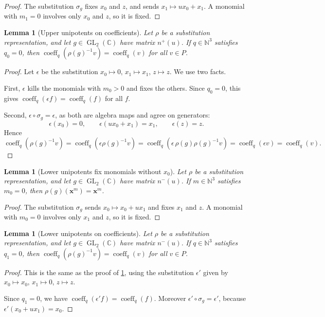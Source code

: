\documentclass[11pt]{article}
\newtheorem{lemma}[theorem]{Lemma}
\theoremstyle{definition}
\theoremstyle{remark}
\newcommand{\CC}{\mathbb{C}}
\newcommand{\NN}{\mathbb{N}}
\DeclareMathOperator{\GL}{GL}
\DeclareMathOperator{\coeff}{coeff}
\begin{document}
\begin{proof}
The substitution $\sigma_g$ fixes $x_0$ and $z$, and sends $x_1\mapsto ux_0+x_1$. A monomial with $m_1=0$ involves only $x_0$ and $z$, so it is fixed.
\end{proof}

\begin{lemma}[Upper unipotents on coefficients]\label{lem:gm_coeff_rho_ux_inv}
Let $\rho$ be a substitution representation, and let $g\in\GL_2(\CC)$ have matrix $n^+(u)$. If $q\in\NN^3$ satisfies $q_0=0$, then $\coeff_q(\rho(g)^{-1}v)=\coeff_q(v)$ for all $v\in P$.
\end{lemma}

\begin{proof}
Let $\epsilon$ be the substitution $x_0\mapsto0$, $x_1\mapsto x_1$, $z\mapsto z$. We use two facts.

First, $\epsilon$ kills the monomials with $m_0>0$ and fixes the others. Since $q_0=0$, this gives $\coeff_q(\epsilon f)=\coeff_q(f)$ for all $f$.

Second, $\epsilon\circ\sigma_g=\epsilon$, as both are algebra maps and agree on generators:
\[
\epsilon(x_0)=0,\qquad \epsilon(ux_0+x_1)=x_1,\qquad \epsilon(z)=z .
\]
Hence
\[
\coeff_q(\rho(g)^{-1}v)=\coeff_q(\epsilon\rho(g)^{-1}v)=\coeff_q(\epsilon\,\rho(g)\rho(g)^{-1}v)=\coeff_q(\epsilon v)=\coeff_q(v).
\]
\end{proof}

\begin{lemma}[Lower unipotents fix monomials without $x_0$]\label{lem:gm_rho_uy_monomial}
Let $\rho$ be a substitution representation, and let $g\in\GL_2(\CC)$ have matrix $n^-(u)$. If $m\in\NN^3$ satisfies $m_0=0$, then $\rho(g)(\mathbf x^m)=\mathbf x^m$.
\end{lemma}

\begin{proof}
The substitution $\sigma_g$ sends $x_0\mapsto x_0+ux_1$ and fixes $x_1$ and $z$. A monomial with $m_0=0$ involves only $x_1$ and $z$, so it is fixed.
\end{proof}

\begin{lemma}[Lower unipotents on coefficients]\label{lem:gm_coeff_rho_uy_inv}
Let $\rho$ be a substitution representation, and let $g\in\GL_2(\CC)$ have matrix $n^-(u)$. If $q\in\NN^3$ satisfies $q_1=0$, then $\coeff_q(\rho(g)^{-1}v)=\coeff_q(v)$ for all $v\in P$.
\end{lemma}

\begin{proof}
This is the same as the proof of \cref{lem:gm_coeff_rho_ux_inv}, using the substitution $\epsilon'$ given by $x_0\mapsto x_0$, $x_1\mapsto0$, $z\mapsto z$.

Since $q_1=0$, we have $\coeff_q(\epsilon'f)=\coeff_q(f)$. Moreover $\epsilon'\circ\sigma_g=\epsilon'$, because $\epsilon'(x_0+ux_1)=x_0$.
\end{proof}
\end{document}
